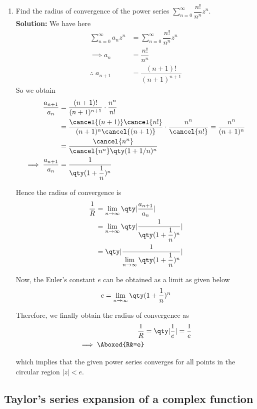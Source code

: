 \begin{enumerate}
				\item Find the radius of convergence of the power series $\sum_{n=0}^{\infty}{\dfrac{n!}{n^n}z^n}$.\\
				\textbf{Solution:} We have here
				\begin{align*}
					\sum_{n=0}^{\infty}{a_nz^n}&=\sum_{n=0}^{\infty}{\dfrac{n!}{n^n}z^n} \\
					\implies a_n&=\dfrac{n!}{n^n} \\
					\therefore\;a_{n+1}&=\dfrac{(n+1)!}{(n+1)^{n+1}}
				\end{align*}
				So we obtain
				\begin{align*}
					\dfrac{a_{n+1}}{a_n}&=\dfrac{(n+1)!}{(n+1)^{n+1}}\cdot\dfrac{n^n}{n!} \\
						&=\dfrac{\cancel{(n+1)}\cancel{n!}}{(n+1)^{n}\cancel{(n+1)}}\cdot\dfrac{n^n}{\cancel{n!}}=\dfrac{n^n}{(n+1)^n} \\
						&=\dfrac{\cancel{n^n}}{\cancel{n^n}\qty(1+1/n)^n} \\
					\implies\dfrac{a_{n+1}}{a_n}&=\dfrac{1}{\qty(1+\dfrac{1}{n})^n}
				\end{align*}
				
				Hence the radius of convergence is
				\begin{align*}
					\dfrac{1}{R}&=\lim_{n\to\infty}{\qty|\dfrac{a_{n+1}}{a_n}|} \\
						&=\lim_{n\to\infty}{\qty|\dfrac{1}{\qty(1+\dfrac{1}{n})^n}|} \\
						&=\qty|\dfrac{1}{\lim\limits_{n\to\infty}{\qty(1+\dfrac{1}{n})^n}}|
				\end{align*}
				
				Now, the Euler's constant $e$ can be obtained as a limit as given below
				\begin{align*}
					e=\lim_{n\to\infty}{\qty(1+\dfrac{1}{n})^n}
				\end{align*}
				
				Therefore, we finally obtain the radius of convergence as
				\begin{align*}
					\dfrac{1}{R}&=\qty|\dfrac{1}{e}|=\dfrac{1}{e} \\
					\implies\Aboxed{R&=e}
				\end{align*}
				
				which implies that the given power series converges for all points in the circular region $|z|<e$.
			\end{enumerate}
	
	\subsection{Taylor's series expansion of a complex function}
	
